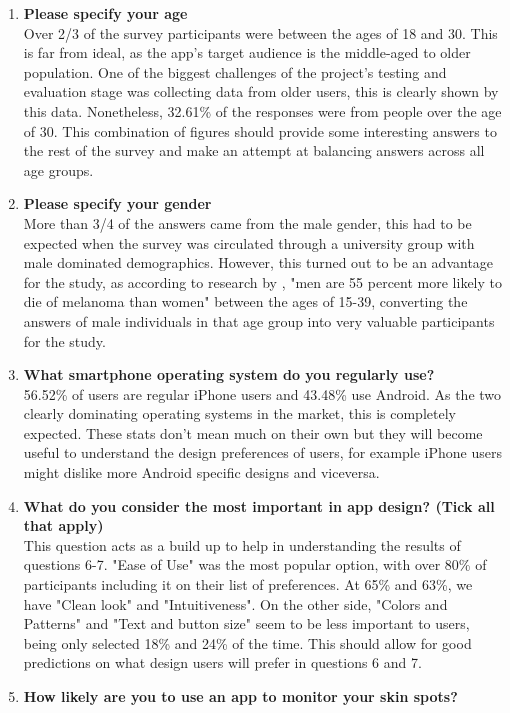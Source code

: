 \begin{enumerate}
    \item \textbf{Please specify your age}
    \\ Over 2/3 of the survey participants were between the ages of 18 and 30. This is far from ideal, as the app's target audience is the middle-aged to older population. One of the biggest challenges of the project's testing and evaluation stage was collecting data from older users, this is clearly shown by this data. Nonetheless, 32.61\% of the responses were from people over the age of 30. This combination of figures should provide some interesting answers to the rest of the survey and make an attempt at balancing answers across all age groups. 
    \item \textbf{Please specify your gender}
    \\ More than 3/4 of the answers came from the male gender, this had to be expected when the survey was circulated through a university group with male dominated demographics. However, this turned out to be an advantage for the study, as according to research by \cite{fisher2013disproportionate}, "men are 55 percent more likely to die of melanoma than women" between the ages of 15-39, converting the answers of male individuals in that age group into very valuable participants for the study.
    \item \textbf{What smartphone operating system do you regularly use?}
    \\ 56.52\% of users are regular iPhone users and 43.48\% use Android. As the two clearly dominating operating systems in the market, this is completely expected. These stats don't mean much on their own but they will become useful to understand the design preferences of users, for example iPhone users might dislike more Android specific designs and viceversa.
    \item \textbf{What do you consider the most important in app design? (Tick all that apply)}
    \\ This question acts as a build up to help in understanding the results of questions 6-7. "Ease of Use" was the most popular option, with over 80\% of participants including it on their list of preferences. At 65\% and 63\%, we have "Clean look" and "Intuitiveness". On the other side, "Colors and Patterns" and "Text and button size" seem to be less important to users, being only selected 18\% and 24\% of the time. This should allow for good predictions on what design users will prefer in questions 6 and 7.
    \item \textbf{How likely are you to use an app to monitor your skin spots?}

\end{enumerate}
